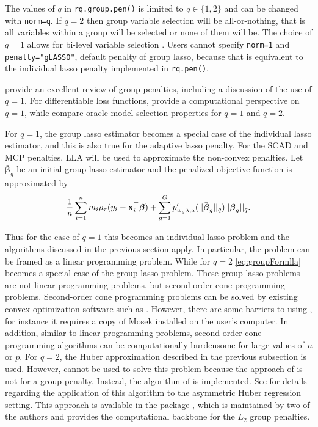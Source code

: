 The values of \(q\) in \texttt{rq.group.pen()} is limited to \(q \in \{1,2\}\) and can be changed with \texttt{norm=q}. If \(q=2\) then group variable selection will be all-or-nothing, that is all variables within a group will be selected or none of them will be. The choice of \(q=1\) allows for bi-level variable selection \citep{penBiLevel}. Users cannot specify \texttt{norm=1} and \texttt{penalty="gLASSO"}, default penalty of group lasso, because that is equivalent to the individual lasso penalty implemented in \texttt{rq.pen()}.

\citet{groupReview} provide an excellent review of group penalties, including a discussion of the use of \(q=1\). For differentiable loss functions, \citet{penBiLevel} provide a computational perspective on \(q=1\), while \citet{mestatp} compare oracle model selection properties for \(q=1\) and \(q=2\).

For \(q=1\), the group lasso estimator becomes a special case of the individual lasso estimator, and this is also true for the adaptive lasso penalty. For the SCAD and MCP penalties, LLA will be used to approximate the non-convex penalties. Let \(\bar{\boldsymbol \beta}_g\) be an initial group lasso estimator and the penalized objective function is approximated by
\begin{equation}
\frac{1}{n} \sum_{i=1}^n m_i \rho_\tau(y_i - {\bf x}_i^\top\boldsymbol \beta) + \sum_{g=1}^G p'_{w_g\lambda,a}(||\bar{\boldsymbol \beta}_g||_q)||\boldsymbol \beta_g||_q.
\label{eq:groupFormlla}
\end{equation}

Thus for the case of \(q=1\) this becomes an individual lasso problem and the algorithms discussed in the previous section apply. In particular, the problem can be framed as a linear programming problem. While for \(q=2\) \eqref{eq:groupFormlla} becomes a special case of the group lasso problem. These group lasso problems are not linear programming problems, but second-order cone programming problems. Second-order cone programming problems can be solved by existing convex optimization software such as  \citep{JSSv060i05}. However, there are some barriers to using , for instance it requires a copy of Mosek installed on the user's computer. In addition, similar to linear programming problems, second-order cone programming algorithms can be computationally burdensome for large values of \(n\) or \(p\). For \(q=2\), the Huber approximation described in the previous subsection is used. However,  cannot be used to solve this problem because the approach of \citet{huber_cd} is not for a group penalty. Instead, the algorithm of \citet{Yang2015} is implemented. See \citet{SherwoodLi2022} for details regarding the application of this algorithm to the asymmetric Huber regression setting. This approach is available in the package , which is maintained by two of the authors and provides the computational backbone for the \(L_2\) group penalties.

